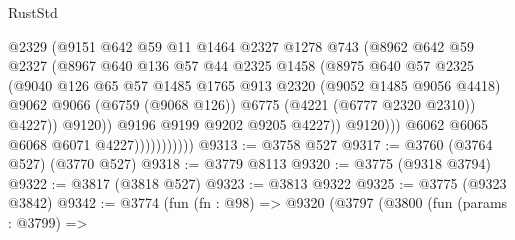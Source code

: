 \begin{lexlean}{RustStd}
\begin{coremodule}
                                  @2329
                                  (@9151
                                    @642
                                    @59
                                    @11
                                    @1464
                                    @2327
                                    @1278
                                    @743
                                    (@8962
                                      @642
                                      @59
                                      @2327
                                      (@8967
                                        @640
                                        @136
                                        @57
                                        @44
                                        @2325
                                        @1458
                                        (@8975
                                          @640
                                          @57
                                          @2325
                                          (@9040
                                            @126
                                            @65
                                            @57
                                            @1485
                                            @1765
                                            @913
                                            @2320
                                            (@9052 @1485 @9056 @4418)
                                            @9062
                                            @9066
                                            (@6759 (@9068 @126))
                                            @6775
                                            (@4221 (@6777 @2320 @2310))
                                            @4227))
                                        @9120))
                                    @9196
                                    @9199
                                    @9202
                                    @9205
                                    @4227))
                                @9120)))
                          @6062
                          @6065
                          @6068
                          @6071
                          @4227)))))))))))
@9313 := @3758 @527
@9317 := @3760 (@3764 @527) (@3770 @527)
@9318 := @3779 @8113
@9320 := @3775 (@9318 @3794)
@9322 := @3817 (@3818 @527)
@9323 := @3813 @9322
@9325 := @3775 (@9323 @3842)
@9342 := @3774
    (fun (fn : @98) =>
    @9320
      (@3797
        (@3800
          (fun (params : @3799) =>

\end{coremodule}
\end{lexlean}
